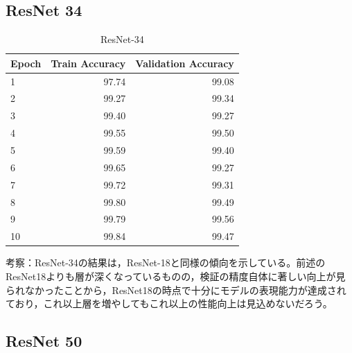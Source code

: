 \documentclass[a4paper,11pt,titlepage]{jsarticle}
\begin{document}
\subsection{ResNet 34}
\begin{table}[h]
\centering
\caption{ResNet-34}
\label{tab:ResNet34}
\begin{tabular}{lrr}
\hline
 Epoch &  Train Accuracy &  Validation Accuracy \\
\hline
     1 &           97.74 &                99.08 \\
     2 &           99.27 &                99.34 \\
     3 &           99.40 &                99.27 \\
     4 &           99.55 &                99.50 \\
     5 &           99.59 &                99.40 \\
     6 &           99.65 &                99.27 \\
     7 &           99.72 &                99.31 \\
     8 &           99.80 &                99.49 \\
     9 &           99.79 &                99.56 \\
    10 &           99.84 &                99.47 \\
\hline
\end{tabular}
\end{table}

考察：ResNet-34の結果は，ResNet-18と同様の傾向を示している。前述のResNet18よりも層が深くなっているものの，検証の精度自体に著しい向上が見られなかったことから，ResNet18の時点で十分にモデルの表現能力が達成されており，これ以上層を増やしてもこれ以上の性能向上は見込めないだろう。

\subsection{ResNet 50}
\end{document}
